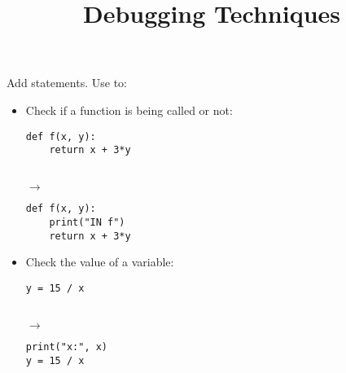 \documentclass{handout}
\title{Debugging Techniques}
\begin{document}
\begin{multicols}{2}

\section{}

Add  statements. Use to:

\begin{itemize}

\item Check if a function is being called or not: \\
\noindent
\begin{minipage}[t]{0.42\columnwidth}
\begin{lstlisting}
def f(x, y):
    return x + 3*y
\end{lstlisting}
\end{minipage}
\begin{minipage}[t]{0.05\columnwidth}
\  \\
\hspace*{1ex}$\rightarrow$
\end{minipage}
\begin{minipage}[t]{0.42\columnwidth}
\begin{lstlisting}
def f(x, y):
    print("IN f")
    return x + 3*y
\end{lstlisting}
\end{minipage}

\item Check the value of a variable: \\
\noindent
\begin{minipage}[t]{0.42\columnwidth}
\begin{lstlisting}
y = 15 / x
\end{lstlisting}
\end{minipage}
\begin{minipage}[t]{0.05\columnwidth}
\  \\
\hspace*{1ex}$\rightarrow$
\end{minipage}
\begin{minipage}[t]{0.42\columnwidth}
\begin{lstlisting}
print("x:", x)
y = 15 / x
\end{lstlisting}
\end{minipage}


\end{itemize}
\end{multicols}
\end{document}
